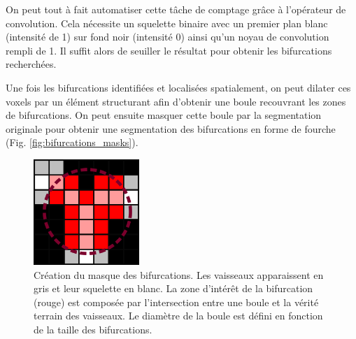 On peut tout à fait automatiser cette tâche de comptage grâce à l'opérateur de convolution. Cela nécessite un squelette binaire avec un premier plan blanc (intensité de 1) sur fond noir (intensité 0) ainsi qu'un noyau de convolution rempli de 1. Il suffit alors de seuiller le résultat pour obtenir les bifurcations recherchées.

Une fois les bifurcations identifiées et localisées spatialement, on peut dilater ces voxels par un élément structurant afin d'obtenir une boule recouvrant les zones de bifurcations. On peut ensuite masquer cette boule par la segmentation originale pour obtenir une segmentation des bifurcations en forme de fourche (Fig. \ref{fig:bifurcations_masks}).

\begin{figure}[!ht]
  \centering
  \includegraphics[height=4cm]{Images/bifurcation_creation.png}
  \caption{Création du masque des bifurcations. Les vaisseaux apparaissent en gris et leur squelette en blanc. La zone d'intérêt de la bifurcation (rouge) est composée par l'intersection entre une boule et la vérité terrain des vaisseaux. Le diamètre de la boule est défini en fonction de la taille des bifurcations.}
  \label{fig:barbelures}
\end{figure}

